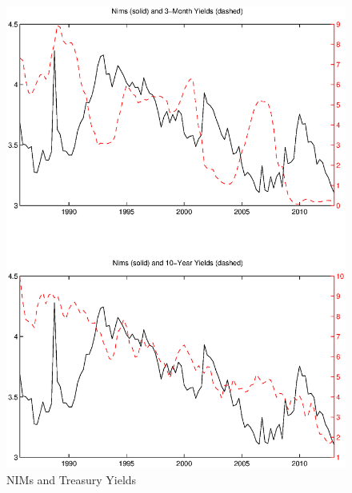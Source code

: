 \documentclass[11pt]{article}
\begin{document}
\begin{figure}
\caption{NIMs and Treasury Yields} \label{figure_nims_rates}
\center
\includegraphics[scale=0.85]{figure_nims_rates.ps}
\end{figure}
\end{document}
